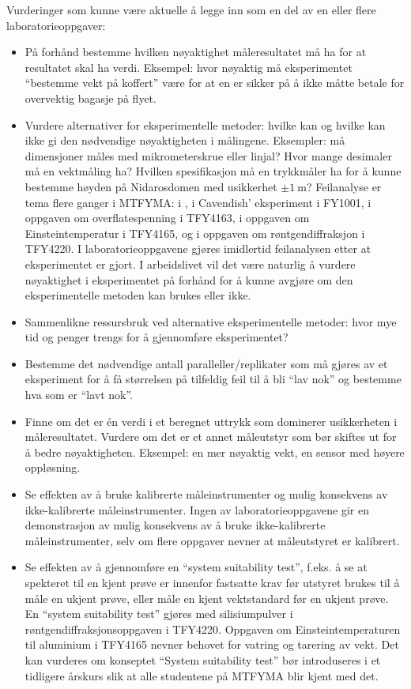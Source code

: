 \documentclass{article}
\begin{document}
Vurderinger som kunne være aktuelle å legge inn som en del av en eller flere laboratorieoppgaver:
\begin{itemize}
  \item På forhånd bestemme hvilken nøyaktighet måleresultatet må ha for at resultatet skal ha verdi. Eksempel: hvor nøyaktig må eksperimentet ``bestemme vekt på koffert'' være for at en er sikker på å ikke måtte betale for overvektig bagasje på flyet.
  \item Vurdere alternativer for eksperimentelle metoder: hvilke kan og hvilke kan ikke gi den nødvendige nøyaktigheten i målingene. Eksempler: må dimensjoner måles med mikrometerskrue eller linjal? Hvor mange desimaler må en vektmåling ha? Hvilken spesifikasjon må en trykkmåler ha for å kunne bestemme høyden på Nidarosdomen med usikkerhet $\pm\SI{1}{\meter}$? Feilanalyse er tema flere ganger i MTFYMA: i \cite{Persson2020}, i Cavendish’ eksperiment i FY1001, i oppgaven om overflatespenning i TFY4163, i oppgaven om Einsteintemperatur i TFY4165, og i oppgaven om røntgendiffraksjon i TFY4220. I laboratorieoppgavene gjøres imidlertid feilanalysen etter at eksperimentet er gjort. I arbeidslivet vil det være naturlig å vurdere nøyaktighet i eksperimentet på forhånd for å kunne avgjøre om den eksperimentelle metoden kan brukes eller ikke.
  \item Sammenlikne ressursbruk ved alternative eksperimentelle metoder: hvor mye tid og penger trengs for å gjennomføre eksperimentet?
  \item Bestemme det nødvendige antall paralleller/replikater som må gjøres av et eksperiment for å få størrelsen på tilfeldig feil til å bli ``lav nok'' og bestemme hva som er ``lavt nok''.
  \item Finne om det er én verdi i et beregnet uttrykk som dominerer usikkerheten i måleresultatet. Vurdere om det er et annet måleutstyr som bør skiftes ut for å bedre nøyaktigheten. Eksempel: en mer nøyaktig vekt, en sensor med høyere oppløsning.
  \item Se effekten av å bruke kalibrerte måleinstrumenter og mulig konsekvens av ikke-kalibrerte måleinstrumenter. Ingen av laboratorieoppgavene gir en demonstrasjon av mulig konsekvens av å bruke ikke-kalibrerte måleinstrumenter, selv om flere oppgaver nevner at måleutstyret er kalibrert.
  \item Se effekten av å gjennomføre en ``system suitability test'', f.eks. å se at spekteret til en kjent prøve er innenfor fastsatte krav før utstyret brukes til å måle en ukjent prøve, eller måle en kjent vektstandard før en ukjent prøve.  En ``system suitability test'' gjøres med silisiumpulver i røntgendiffraksjonsoppgaven i TFY4220. Oppgaven om Einsteintemperaturen til aluminium i TFY4165 nevner behovet for vatring og tarering av vekt. Det kan vurderes om konseptet ``System suitability test'' bør introduseres i et tidligere årskurs slik at alle studentene på MTFYMA blir kjent med det.
\end{itemize}
\end{document}
